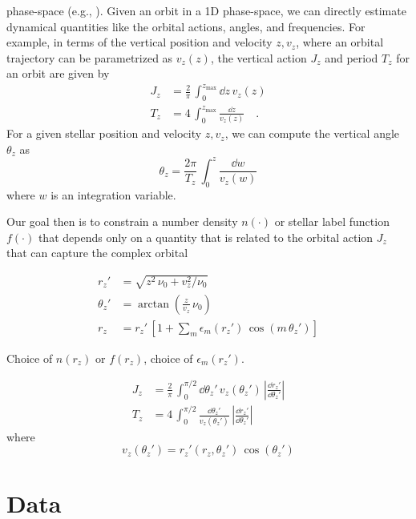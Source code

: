 phase-space (e.g., \citealt{Price-Whelan:2021}).
Given an orbit in a 1D phase-space, we can directly estimate dynamical quantities like
the orbital actions, angles, and frequencies.
For example, in terms of the vertical position and velocity $z, v_z$, where an orbital
trajectory can be parametrized as $v_z(z)$, the vertical action $J_z$ and period $T_z$
for an orbit are given by
\begin{align}
    J_z &= \frac{2}{\pi} \, \int_0^{z_{\textrm{max}}} \dd z \, v_z(z) \\
    T_z &= 4 \, \int_0^{z_{\textrm{max}}} \frac{\dd z}{v_z(z)}\quad .
\end{align}
For a given stellar position and velocity $z, v_z$, we can compute the vertical angle $\theta_z$ as
\begin{equation}
    \theta_z = \frac{2\pi}{T_z} \, \int_0^{z} \frac{\dd w}{v_z(w)}
\end{equation}
where $w$ is an integration variable.

Our goal then is to constrain a number density $n(\cdot)$ or stellar label function $f(\cdot)$ that depends only on a quantity that is related to the orbital action $J_z$ that can capture the complex orbital


\begin{align}
    r_z' &= \sqrt{z^2 \, \nu_0 + v_z^2 / \nu_0} \\
    \theta_z' &= \arctan{\left(\frac{z}{v_z} \, \nu_0 \right)} \\
    r_z &= r_z' \, \left[1 + \sum_m \epsilon_m(r_z') \, \cos{\left(m\,\theta_z'\right)}\right]
\end{align}

Choice of $n(r_z)$ or $f(r_z)$, choice of $\epsilon_m(r_z')$.

\begin{align}
    J_z &= \frac{2}{\pi} \, \int_0^{\pi/2} \dd \theta_z' \, v_z(\theta_z')
        \, \left|\frac{\dd r_z'}{\dd \theta_z'}\right| \\
    T_z &= 4 \, \int_0^{\pi/2} \frac{\dd \theta_z'}{v_z(\theta_z')}
        \, \left|\frac{\dd r_z'}{\dd \theta_z'}\right| \quad
\end{align}
where
\begin{equation}
    v_z(\theta_z') = r_z'(r_z, \theta_z') \, \cos{(\theta_z')}
\end{equation}


\section{Data} \label{sec:data}



